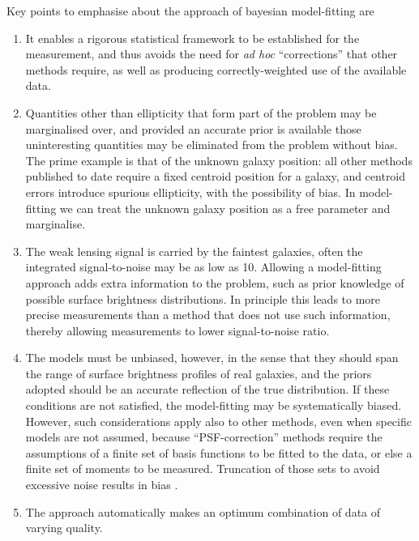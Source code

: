 \documentclass{article}
\begin{document}
Key points to emphasise about the approach of bayesian model-fitting are
\begin{enumerate}
\item
It enables a rigorous statistical framework to be established for the measurement, and thus avoids the
need for {\em ad hoc} ``corrections'' that other methods require, as well as producing correctly-weighted
use of the available data.
\item
Quantities other than ellipticity that form part of the problem may be marginalised over, and provided
an accurate prior is available those uninteresting quantities may be eliminated from the problem without
bias.  The prime example is that of the unknown galaxy position: all other methods published to date
require a fixed centroid position for a galaxy, and centroid errors introduce spurious ellipticity, with
the possibility of bias.  In model-fitting we can treat the unknown galaxy position as a free parameter
and marginalise.
\item
The weak lensing signal is carried by the faintest galaxies, often the integrated signal-to-noise may be
as low as 10.  Allowing a model-fitting approach adds extra information to the problem, 
such as prior knowledge of possible surface brightness distributions.
In principle this
leads to more precise measurements than a method that does not use such information, thereby allowing
measurements to lower signal-to-noise ratio.
\item
The models must be unbiased, however, in the sense that they should span the range of surface brightness
profiles of real galaxies, and the priors adopted should be an accurate reflection of the true distribution.
If these conditions are not satisfied, the model-fitting may be systematically biased.  However, such
considerations apply also to other methods, even when specific models are not assumed, because 
``PSF-correction'' methods require the assumptions of a finite set of basis functions to be fitted to the
data, or else a finite set of moments to be measured. Truncation of those sets to avoid excessive noise
results in bias \citep[e.g.][]{bernstein10a}.
\item
The approach automatically makes an optimum combination of data of varying quality.
\end{enumerate}
\end{document}
